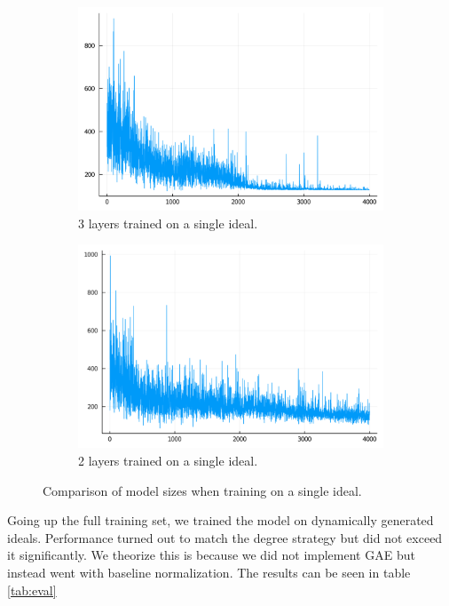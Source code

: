 \documentclass{article}
\theoremstyle{changedot}
\theoremstyle{changedotbreak}
\theoremstyle{nonumberplain}
\begin{document}
\begin{figure}
  \centering
  \begin{subfigure}[b]{0.49\textwidth}
    \centering
    \includegraphics[width=\textwidth]{rews_En3_4k_3layer.png}
    \caption{3 layers trained on a single ideal.}
  \end{subfigure}
  \hfill
  \begin{subfigure}[b]{0.49\textwidth}
    \centering
    \includegraphics[width=\textwidth]{rews_En3_4k_2layer.png}
    \caption{2 layers trained on a single ideal.}
  \end{subfigure}
  \caption{Comparison of model sizes when training on a single ideal.}
  \label{fig:single_ideal}
\end{figure}


Going up the full training set, we trained the model on dynamically generated ideals. Performance turned out to match the degree strategy but did not exceed it significantly. We theorize this is because we did not implement GAE but instead went with baseline normalization. The results can be seen in table \ref{tab:eval}
\end{document}
